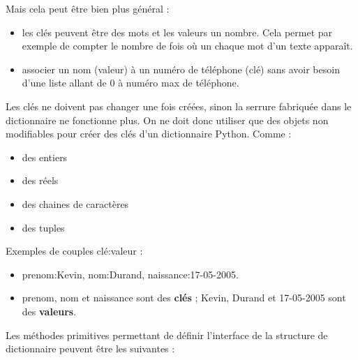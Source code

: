 \documentclass[
  a4paper,
  DIV=11,
  numbers=noendperiod]{scrartcl}
\providecommand{\tightlist}{%
  \setlength{\itemsep}{0pt}\setlength{\parskip}{0pt}}\usepackage{longtable,booktabs,array}
\begin{document}
Mais cela peut être bien plus général :

\begin{itemize}
\tightlist
\item
  les clés peuvent être des mots et les valeurs un nombre. Cela permet
  par exemple de compter le nombre de fois où un chaque mot d'un texte
  apparaît.
\item
  associer un nom (valeur) à un numéro de téléphone (clé) sans avoir
  besoin d'une liste allant de 0 à numéro max de téléphone.
\end{itemize}

Les clés ne doivent pas changer une fois créées, sinon la serrure
fabriquée dans le dictionnaire ne fonctionne plus. On ne doit donc
utiliser que des objets non modifiables pour créer des clés d'un
dictionnaire Python. Comme :

\begin{itemize}
\tightlist
\item
  des entiers
\item
  des réels
\item
  des chaines de caractères
\item
  des tuples
\end{itemize}

\begin{tcolorbox}[enhanced jigsaw, colback=white, colbacktitle=quarto-callout-caution-color!10!white, bottomtitle=1mm, coltitle=black, opacitybacktitle=0.6, opacityback=0, leftrule=.75mm, breakable, toprule=.15mm, arc=.35mm, titlerule=0mm, toptitle=1mm, title=\textcolor{quarto-callout-caution-color}{\faFire}\hspace{0.5em}{Exemple}, rightrule=.15mm, left=2mm, bottomrule=.15mm]

Exemples de couples clé:valeur :

\begin{itemize}
\tightlist
\item
  prenom:Kevin, nom:Durand, naissance:17-05-2005.
\item
  prenom, nom et naissance sont des \textbf{clés} ; Kevin, Durand et
  17-05-2005 sont des \textbf{valeurs}.
\end{itemize}

\end{tcolorbox}

Les méthodes primitives permettant de définir l'interface de la
structure de dictionnaire peuvent être les suivantes :
\end{document}
